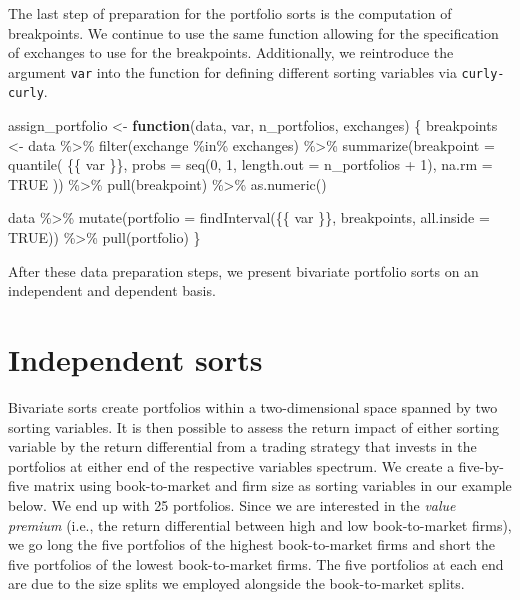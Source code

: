 \documentclass[
]{krantz}
\newenvironment{Shaded}{\begin{snugshade}}{\end{snugshade}}
\newcommand{\AttributeTok}[1]{\textcolor[rgb]{0.61,0.61,0.61}{#1}}
\newcommand{\ConstantTok}[1]{\textcolor[rgb]{0,0,0}{#1}}
\newcommand{\ControlFlowTok}[1]{\textcolor[rgb]{0.27,0.27,0.27}{\textbf{#1}}}
\newcommand{\DecValTok}[1]{\textcolor[rgb]{0.06,0.06,0.06}{#1}}
\newcommand{\FunctionTok}[1]{\textcolor[rgb]{0,0,0}{#1}}
\newcommand{\NormalTok}[1]{#1}
\newcommand{\OtherTok}[1]{\textcolor[rgb]{0.37,0.37,0.37}{#1}}
\newcommand{\SpecialCharTok}[1]{\textcolor[rgb]{0,0,0}{#1}}
\begin{document}
The last step of preparation for the portfolio sorts is the computation of breakpoints. We continue to use the same function allowing for the specification of exchanges to use for the breakpoints. Additionally, we reintroduce the argument \texttt{var} into the function for defining different sorting variables via \texttt{curly-curly}.

\begin{Shaded}
\begin{Highlighting}[]
\NormalTok{assign\_portfolio }\OtherTok{\textless{}{-}} \ControlFlowTok{function}\NormalTok{(data, var, n\_portfolios, exchanges) \{}
\NormalTok{  breakpoints }\OtherTok{\textless{}{-}}\NormalTok{ data }\SpecialCharTok{\%\textgreater{}\%}
    \FunctionTok{filter}\NormalTok{(exchange }\SpecialCharTok{\%in\%}\NormalTok{ exchanges) }\SpecialCharTok{\%\textgreater{}\%}
    \FunctionTok{summarize}\NormalTok{(}\AttributeTok{breakpoint =} \FunctionTok{quantile}\NormalTok{(}
\NormalTok{      \{\{ var \}\},}
      \AttributeTok{probs =} \FunctionTok{seq}\NormalTok{(}\DecValTok{0}\NormalTok{, }\DecValTok{1}\NormalTok{, }\AttributeTok{length.out =}\NormalTok{ n\_portfolios }\SpecialCharTok{+} \DecValTok{1}\NormalTok{),}
      \AttributeTok{na.rm =} \ConstantTok{TRUE}
\NormalTok{    )) }\SpecialCharTok{\%\textgreater{}\%}
    \FunctionTok{pull}\NormalTok{(breakpoint) }\SpecialCharTok{\%\textgreater{}\%}
    \FunctionTok{as.numeric}\NormalTok{()}

\NormalTok{  data }\SpecialCharTok{\%\textgreater{}\%}
    \FunctionTok{mutate}\NormalTok{(}\AttributeTok{portfolio =} \FunctionTok{findInterval}\NormalTok{(\{\{ var \}\}, breakpoints, }\AttributeTok{all.inside =} \ConstantTok{TRUE}\NormalTok{)) }\SpecialCharTok{\%\textgreater{}\%}
    \FunctionTok{pull}\NormalTok{(portfolio)}
\NormalTok{\}}
\end{Highlighting}
\end{Shaded}

After these data preparation steps, we present bivariate portfolio sorts on an independent and dependent basis.

\hypertarget{independent-sorts}{%
\section{Independent sorts}\label{independent-sorts}}

Bivariate sorts create portfolios within a two-dimensional space spanned by two sorting variables. It is then possible to assess the return impact of either sorting variable by the return differential from a trading strategy that invests in the portfolios at either end of the respective variables spectrum. We create a five-by-five matrix using book-to-market and firm size as sorting variables in our example below. We end up with 25 portfolios. Since we are interested in the \emph{value premium} (i.e., the return differential between high and low book-to-market firms), we go long the five portfolios of the highest book-to-market firms and short the five portfolios of the lowest book-to-market firms. The five portfolios at each end are due to the size splits we employed alongside the book-to-market splits.
\end{document}
